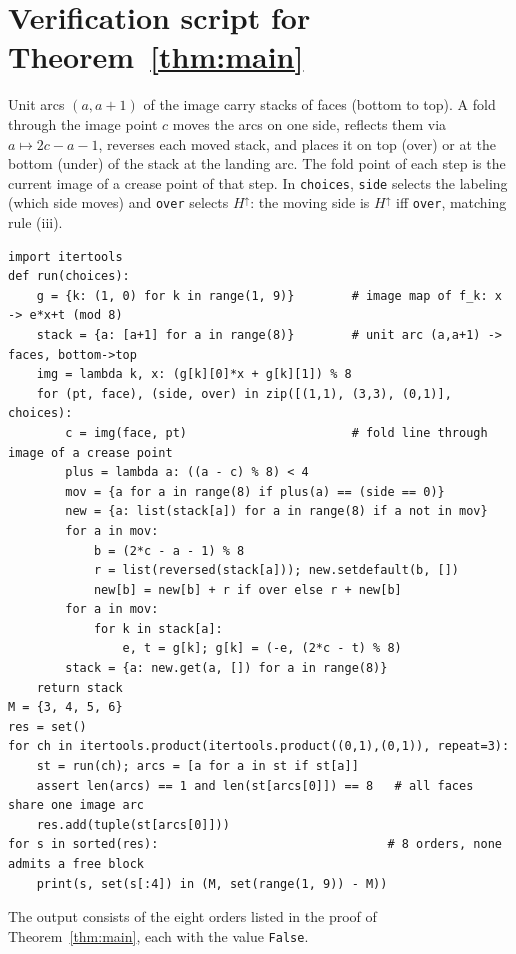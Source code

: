 \documentclass[11pt]{amsart}
\theoremstyle{definition}
\theoremstyle{remark}
\newcommand{\arc}[2]{(#1,#2)}
\newcommand{\up}{H^{\uparrow}}
\begin{document}
\appendix
\section{Verification script for Theorem~\ref{thm:main}}\label{app}
Unit arcs $\arc{a}{a+1}$ of the image carry stacks of faces (bottom to top). A fold through the
image point $c$ moves the arcs on one side, reflects them via $a\mapsto 2c-a-1$, reverses each
moved stack, and places it on top (over) or at the bottom (under) of the stack at the landing
arc. The fold point of each step is the current image of a crease point of that step.
In \texttt{choices}, \texttt{side} selects the labeling (which side moves) and \texttt{over}
selects $\up$: the moving side is $\up$ iff \texttt{over}, matching rule (iii).
{\footnotesize
\begin{verbatim}
import itertools
def run(choices):
    g = {k: (1, 0) for k in range(1, 9)}        # image map of f_k: x -> e*x+t (mod 8)
    stack = {a: [a+1] for a in range(8)}        # unit arc (a,a+1) -> faces, bottom->top
    img = lambda k, x: (g[k][0]*x + g[k][1]) % 8
    for (pt, face), (side, over) in zip([(1,1), (3,3), (0,1)], choices):
        c = img(face, pt)                       # fold line through image of a crease point
        plus = lambda a: ((a - c) % 8) < 4
        mov = {a for a in range(8) if plus(a) == (side == 0)}
        new = {a: list(stack[a]) for a in range(8) if a not in mov}
        for a in mov:
            b = (2*c - a - 1) % 8
            r = list(reversed(stack[a])); new.setdefault(b, [])
            new[b] = new[b] + r if over else r + new[b]
        for a in mov:
            for k in stack[a]:
                e, t = g[k]; g[k] = (-e, (2*c - t) % 8)
        stack = {a: new.get(a, []) for a in range(8)}
    return stack
M = {3, 4, 5, 6}
res = set()
for ch in itertools.product(itertools.product((0,1),(0,1)), repeat=3):
    st = run(ch); arcs = [a for a in st if st[a]]
    assert len(arcs) == 1 and len(st[arcs[0]]) == 8   # all faces share one image arc
    res.add(tuple(st[arcs[0]]))
for s in sorted(res):                                # 8 orders, none admits a free block
    print(s, set(s[:4]) in (M, set(range(1, 9)) - M))
\end{verbatim}
}
The output consists of the eight orders listed in the proof of Theorem~\ref{thm:main}, each with
the value \texttt{False}.
\end{document}
